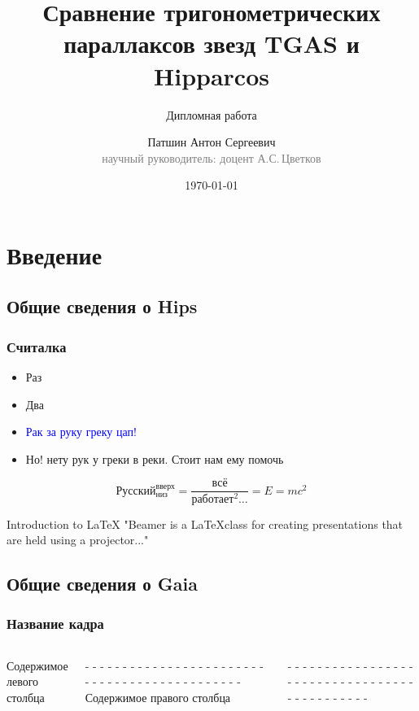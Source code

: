 \documentclass[14pt,aspectratio=43]{beamer}
\begin{document}
\title{Сравнение тригонометрических параллаксов звезд TGAS и Hipparcos}
\subtitle[Диплом]{Дипломная работа}
\author[А.С.\,Патшин]{Патшин Антон Сергеевич\\{\footnotesize\textcolor{gray}{научный руководитель: доцент А.С.\,Цветков}}}
\date{\today} 





\maketitle

\section{Введение}
\subsection{Общие сведения о Hips}
\label{sub:smthhip}
\begin{frame}\frametitle{Считалка} 

  \begin{itemize}
  \item Раз
  \item Два
  \item {\Large \textcolor{blue}{Рак за руку греку цап!}}
  \item Но! нету рук у греки в реки. Стоит нам ему помочь
  \end{itemize}
\begin{equation}
    Русский_{низ}^{вверх} = \frac{всё}{работает^2\dots} = E = m c^2
\end{equation}

\begin{block}{Introduction to {\LaTeX}}
"Beamer is a {\LaTeX}class for creating presentations that
are held using a projector..."
\end{block}
\end{frame}


\subsection{Общие сведения о Gaia}
\label{sub:smthgaia}
\begin{frame}\frametitle{Название кадра}

 	\begin{columns}
 			Содержимое левого столбца
 			
 			- - - - - - - - - - - - - - - - - - - - - - - - - - - - - - - - - - - - - - - - - - - - - 
 			Содержимое правого столбца
 			
 			- - - - - - - - - - - - - - - - - - - - - - - - - - - - - - - - - - - - - - - - - - - - - 
 	\end{columns}
\end{frame}
\end{document}
